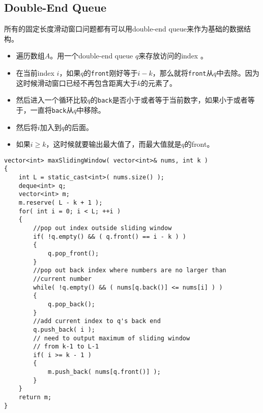 \subsection{Double-End Queue}
所有的固定长度滑动窗口问题都有可以用double-end queue来作为基础的数据结构。
\begin{itemize}
\item 遍历数组$A$。用一个double-end queue $q$来存放访问的index
。
\item 在当前index $i$，如果$q$的\texttt{front}刚好等于$i-k$，那么就将\texttt{front}从$q$中去除。因为这时候滑动窗口已经不再包含距离大于$k$的元素了。
\item 然后进入一个循环比较$q$的\texttt{back}是否小于或者等于当前数字，如果小于或者等于，一直将\texttt{back}从$q$中移除。
\item 然后将$i$加入到$q$的后面。
\item 如果$i\geq k$，这时候就要输出最大值了，而最大值就是$q$的front。
\end{itemize}

\setcounter{lstlisting}{0}
\begin{lstlisting}[style=customc, caption={Deque}]
vector<int> maxSlidingWindow( vector<int>& nums, int k )
{
    int L = static_cast<int>( nums.size() );
    deque<int> q;
    vector<int> m;
    m.reserve( L - k + 1 );
    for( int i = 0; i < L; ++i )
    {
        //pop out index outside sliding window
        if( !q.empty() && ( q.front() == i - k ) )
        {
            q.pop_front();
        }
        //pop out back index where numbers are no larger than
        //current number
        while( !q.empty() && ( nums[q.back()] <= nums[i] ) )
        {
            q.pop_back();
        }
        //add current index to q's back end
        q.push_back( i );
        // need to output maximum of sliding window
        // from k-1 to L-1
        if( i >= k - 1 )
        {
            m.push_back( nums[q.front()] );
        }
    }
    return m;
}
\end{lstlisting}